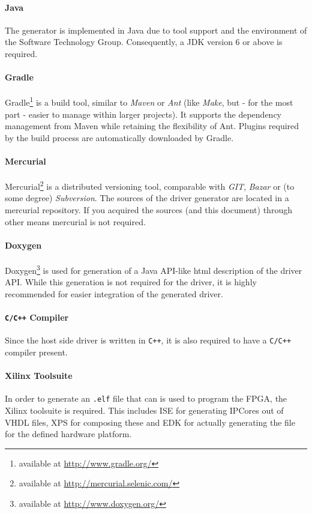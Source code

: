 \documentclass{report}
\begin{document}
\paragraph{Java}
The generator is implemented in Java due to tool support and the environment of the Software Technology Group. Consequently, a JDK version 6 or above is required. 

\paragraph{Gradle}
Gradle\footnote{available at \url{http://www.gradle.org/}} is a build tool, similar to \textit{Maven} or \textit{Ant} (like \textit{Make}, but - for the most part - easier to manage within larger projects). It supports the dependency management from Maven while retaining the flexibility of Ant. Plugins required by the build process are automatically downloaded by Gradle.

\paragraph{Mercurial}
Mercurial\footnote{available at \url{http://mercurial.selenic.com/}} is a distributed versioning tool, comparable with \textit{GIT}, \textit{Bazar} or (to some degree) \textit{Subversion}. The sources of the driver generator are located in a mercurial repository. If you acquired the sources (and this document) through other means mercurial is not required.

\paragraph{Doxygen}
Doxygen\footnote{available at \url{http://www.doxygen.org/}} is used for generation of a Java API-like html description of the driver API. While this generation is not required for the driver, it is highly recommended for easier integration of the generated driver.

\paragraph{\texttt{C/C++} Compiler}
Since the host side driver is written in \texttt{C++}, it is also required to have a \texttt{C/C++} compiler present.

\paragraph{Xilinx Toolsuite}
In order to generate an \texttt{.elf} file that can is used to program the FPGA, the Xilinx toolsuite is required. This includes ISE for generating IPCores out of VHDL files, XPS for composing these and EDK for actually generating the file for the defined hardware platform.
\end{document}
